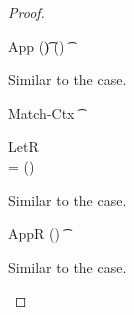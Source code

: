 \documentclass[acmsmall,screen,nonacm%
\Anonymous{,anonymous}{}%
\Final{}{,review}%
]{acmart}
\begin{document}
\begin{theorem}[Canonicalization]
\begin{proof}
\begin{proofcases}
\begin{proofcases}
		\begin{llproof}
\Hand 		  {}
		\end{llproof}
	  \end{proofcases}

      \proofcasederivation
	{App}
	{\semenv(\t) \in \semenv(\x)}
	{\semenv \th \capp \x \t}

      \begin{llproof}
	Similar to the  case.
      \end{llproof}


      \proofcasederivation
        {Match-Ctx}
        {\Cshape \C \t \sh \\ \semenv \th \C\where{\cmatched \t \sh \cbrs}}
        {\semenv \th \C\where{\cmatch \t \cbrs}}


      \begin{llproof}
\Hand        {}
      \end{llproof}

      \proofcasederivation
	{LetR}
        {\semenv\where{\x \is \gabsr} \th \cb \\
         \gabsr = \semenv(\cabsr \tv \tvs \ca) \\
         \gabsr \neq \emptyset
         }
        {\semenv \th \cletr \x \tv \tvs \ca \cb}

      \begin{llproof}
	Similar to the  case.
      \end{llproof}

      \proofcasederivation
	{AppR}
        {\greg {\semenv(\t)} \wild \in \semenv(\x)  }
        {\semenv \th \capp \x \t}

      \begin{llproof}
	Similar to the  case.
      \end{llproof}


\end{proofcases}
\end{proof}
\end{theorem}
\end{document}
